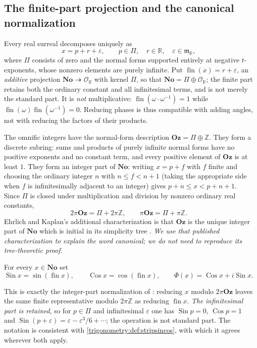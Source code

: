 \documentclass[11pt,letterpaper]{article}
\numberwithin{equation}{section}
\theoremstyle{definition}
\theoremstyle{remark}
\newcommand{\No}{\mathbf{No}}
\newcommand{\Oz}{\mathbf{Oz}}
\newcommand{\R}{\mathbb R}
\newcommand{\Z}{\mathbb Z}
\newcommand{\OO}{\mathcal O}
\newcommand{\mm}{\mathfrak m}
\newcommand{\eps}{\varepsilon}
\newcommand{\fin}{\operatorname{fin}}
\newcommand{\Sin}{\operatorname{Sin}}
\newcommand{\Cos}{\operatorname{Cos}}
\begin{document}
\subsection{The finite-part projection and the canonical normalization}
Every real surreal decomposes uniquely as
\begin{equation}\label{trigonometry:eq:split}
 x=p+r+\eps,\qquad p\in\Pi,\quad r\in\R,\quad\eps\in\mm_{\R},
\end{equation}
where $\Pi$ consists of zero and the normal forms supported entirely at negative $t$-exponents,
whose nonzero elements are purely infinite. Put $\fin(x)=r+\eps$, an \emph{additive} projection
$\No\twoheadrightarrow\OO_{\R}$ with kernel $\Pi$, so that $\No=\Pi\oplus\OO_{\R}$; the finite part
retains both the ordinary constant and all infinitesimal terms, and is not merely the standard
part. It is \emph{not} multiplicative:
$\fin(\omega\cdot\omega^{-1})=1$ while $\fin(\omega)\fin(\omega^{-1})=0$. Reducing phases is thus
compatible with adding angles, not with reducing the factors of their products.

The omnific integers have the normal-form description $\Oz=\Pi\oplus\Z$. They form a discrete
subring: sums and products of purely infinite normal forms have no positive exponents and no
constant term, and every positive element of $\Oz$ is at least $1$. They form an integer part of
$\No$: writing $x=p+f$ with $f$ finite and choosing the ordinary integer $n$ with $n\le f<n+1$
(taking the appropriate side when $f$ is infinitesimally adjacent to an integer) gives
$p+n\le x<p+n+1$. Since $\Pi$ is closed under multiplication and division by nonzero ordinary real
constants,
\begin{equation}\label{trigonometry:eq:periodclass}
 2\pi\Oz=\Pi+2\pi\Z,\qquad \pi\Oz=\Pi+\pi\Z .
\end{equation}
Ehrlich and Kaplan's additional characterization is that $\Oz$ is the unique integer part of $\No$
which is initial in its simplicity tree \cite[Lemma 11.1]{EK}. \emph{We use that published
characterization to explain the word canonical; we do not need to reproduce its tree-theoretic
proof.}

\begin{definition}\label{trigonometry:def:globaltrig}
For every $x\in\No$ set
\[
 \Sin x=\sin(\fin x),\qquad \Cos x=\cos(\fin x),\qquad \Phi(x)=\Cos x+i\Sin x .
\]
\end{definition}
This is exactly the integer-part normalization of \cite[\S11]{EK}: reducing $x$ modulo $2\pi\Oz$
leaves the same finite representative modulo $2\pi\Z$ as reducing $\fin x$. \emph{The infinitesimal
part is retained}, so for $p\in\Pi$ and infinitesimal $\eps$ one has $\Sin p=0$, $\Cos p=1$ and
$\Sin(p+\eps)=\eps-\eps^3/6+\cdots$; the operation is not standard part. The notation is consistent
with \cref{trigonometry:def:stripsincos}, with which it agrees wherever both apply.
\end{document}
